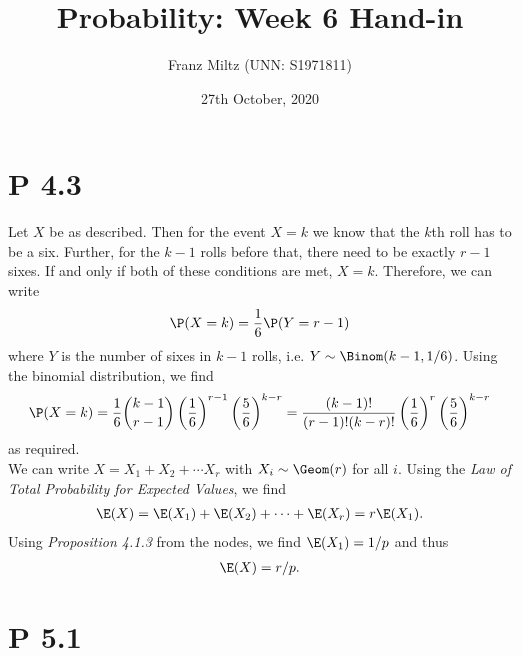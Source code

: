 \documentclass{article}
\begin{document}
\title{Probability: Week 6 Hand-in}
\author{Franz Miltz (UNN: S1971811)}
\date{27th October, 2020}
\maketitle


\section*{P 4.3}


Let $X$ be as described. Then for the event $X=k$ we know that
the $k$th roll has to be a six. Further, for the $k-1$ rolls before
that, there need to be exactly $r-1$ sixes. If and only if both of these
conditions are met, $X=k$. Therefore, we can write
\begin{align*}
  \P(X=k) = \frac{1}{6}\P(Y=r-1)
\end{align*}
where $Y$ is the number of sixes in $k-1$ rolls, i.e. $Y\sim\Binom(k-1,1/6)$. Using the binomial
distribution, we find
\begin{align*}
  \P(X=k) = \frac{1}{6}\binom{k-1}{r-1}\left(\frac{1}{6}\right)^ {r-1}
  \left(\frac{5}{6}\right)^{k-r}
  = \frac{(k-1)!}{(r-1)!(k-r)!}\left(\frac{1}{6}\right)^r\left(\frac{5}{6}\right)^{k-r}
\end{align*}
as required. \\
We can write $X=X_1+X_2+\cdots X_r$ with $X_i\sim \Geom(r)$ for all $i$. 
Using the \emph{Law of Total Probability for Expected Values}, we find
\begin{align*}
  \E(X) = \E(X_1) + \E(X_2) + \cdots + \E(X_r) = r\E(X_1).
\end{align*}
Using \emph{Proposition 4.1.3} from the nodes, we find $\E(X_1) = 1/p$ and thus
\begin{align*}
  \E(X) = r/p.
\end{align*}


\section*{P 5.1}
\end{document}
